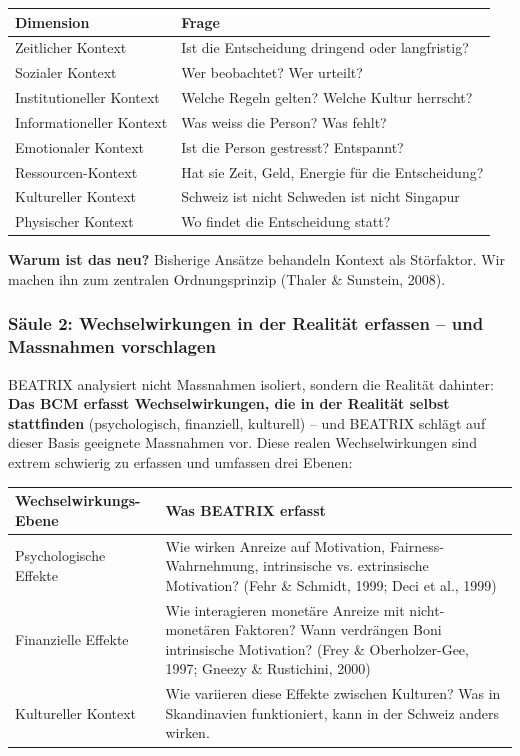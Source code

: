 \documentclass[11pt,a4paper]{article}
\begin{document}
\begin{table}[h]
\centering
\begin{tabular}{@{}L{4cm}L{9cm}@{}}
\toprule
\textbf{Dimension} & \textbf{Frage} \\
\midrule
Zeitlicher Kontext & Ist die Entscheidung dringend oder langfristig? \\
Sozialer Kontext & Wer beobachtet? Wer urteilt? \\
Institutioneller Kontext & Welche Regeln gelten? Welche Kultur herrscht? \\
Informationeller Kontext & Was weiss die Person? Was fehlt? \\
Emotionaler Kontext & Ist die Person gestresst? Entspannt? \\
Ressourcen-Kontext & Hat sie Zeit, Geld, Energie für die Entscheidung? \\
Kultureller Kontext & Schweiz ist nicht Schweden ist nicht Singapur \\
Physischer Kontext & Wo findet die Entscheidung statt? \\
\bottomrule
\end{tabular}
\end{table}

\textbf{Warum ist das neu?} Bisherige Ansätze behandeln Kontext als Störfaktor. Wir machen ihn zum zentralen Ordnungsprinzip (Thaler \& Sunstein, 2008).

\subsubsection{Säule 2: Wechselwirkungen in der Realität erfassen -- und Massnahmen vorschlagen}

BEATRIX analysiert nicht Massnahmen isoliert, sondern die Realität dahinter: \textbf{Das BCM erfasst Wechselwirkungen, die in der Realität selbst stattfinden} (psychologisch, finanziell, kulturell) -- und BEATRIX schlägt auf dieser Basis geeignete Massnahmen vor. Diese realen Wechselwirkungen sind extrem schwierig zu erfassen und umfassen drei Ebenen:

\begin{table}[h]
\centering
\begin{tabular}{@{}L{4cm}L{9cm}@{}}
\toprule
\textbf{Wechselwirkungs-Ebene} & \textbf{Was BEATRIX erfasst} \\
\midrule
Psychologische Effekte & Wie wirken Anreize auf Motivation, Fairness-Wahrnehmung, intrinsische vs. extrinsische Motivation? (Fehr \& Schmidt, 1999; Deci et al., 1999) \\
Finanzielle Effekte & Wie interagieren monetäre Anreize mit nicht-monetären Faktoren? Wann verdrängen Boni intrinsische Motivation? (Frey \& Oberholzer-Gee, 1997; Gneezy \& Rustichini, 2000) \\
Kultureller Kontext & Wie variieren diese Effekte zwischen Kulturen? Was in Skandinavien funktioniert, kann in der Schweiz anders wirken. \\
\bottomrule
\end{tabular}
\end{table}
\end{document}
